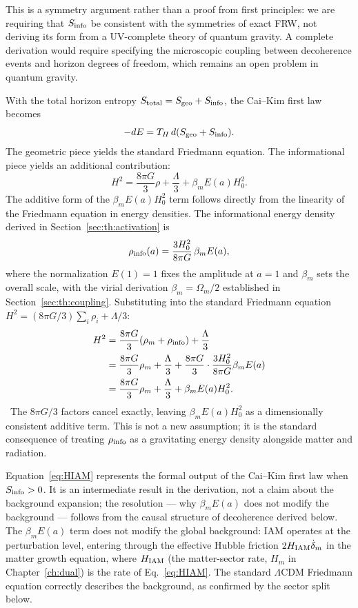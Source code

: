This is a symmetry argument rather than a proof from first principles: we are requiring that $S_{\rm info}$ be consistent with the symmetries of exact
FRW, not deriving its form from a UV-complete theory of quantum gravity. A complete derivation would require specifying the microscopic coupling between
decoherence events and horizon degrees of freedom, which remains an open problem in quantum gravity. \openprob

With the total horizon entropy $S_{\rm total}=S_{\rm geo}+S_{\rm info}$, the Cai--Kim first law becomes
\begin{equation}-dE=T_H\,d(S_{\rm geo}+S_{\rm info}).\label{eq:th:firstlaw3}\end{equation}
The geometric piece yields the standard Friedmann equation. The informational piece yields an additional contribution:
\begin{equation}H^2=\frac{8\pi G}{3}\rho+\frac\Lambda3+\beta_mE(a)H_0^2 .\label{eq:HIAM}\end{equation}
The additive form of the $\beta_mE(a)H_0^2$ term follows directly from the linearity of the Friedmann equation in energy densities. The informational
energy density derived in Section~\ref{sec:th:activation} is
\begin{equation}\rho_{\rm info}(a)=\frac{3H_0^2}{8\pi G}\,\beta_mE(a),\label{eq:th:rhoinfo}\end{equation}
where the normalization $E(1)=1$ fixes the amplitude at $a=1$ and $\beta_m$ sets the overall scale, with the virial derivation $\beta_m=\Omega_m/2$
established in Section~\ref{sec:th:coupling}. Substituting into the standard Friedmann equation $H^2=(8\pi G/3)\sum_i\rho_i+\Lambda/3$:
\begin{equation}\begin{aligned}H^2&=\frac{8\pi G}{3}(\rho_m+\rho_{\rm info})+\frac\Lambda3\\&=\frac{8\pi G}{3}\rho_m+\frac\Lambda3+\frac{8\pi G}{3}\cdot\frac{3H_0^2}{8\pi G}\beta_mE(a)
\\&=\frac{8\pi G}{3}\rho_m+\frac\Lambda3+\beta_mE(a)H_0^2 .\end{aligned}\label{eq:th:cancel}\end{equation}
\derived\ The $8\pi G/3$ factors cancel exactly, leaving $\beta_mE(a)H_0^2$ as a dimensionally consistent additive term. This is not a new assumption;
it is the standard consequence of treating $\rho_{\rm info}$ as a gravitating energy density alongside matter and radiation.

Equation~\eqref{eq:HIAM} represents the formal output of the Cai--Kim first law when $S_{\rm info}>0$. It is an intermediate result in the derivation,
not a claim about the background expansion; the resolution --- why $\beta_mE(a)$ does not modify the background --- follows from the causal structure of
decoherence derived below. The $\beta_mE(a)$ term does not modify the global background: IAM operates at the perturbation level, entering through the
effective Hubble friction $2H_{\rm IAM}\dot\delta_m$ in the matter growth equation, where $H_{\rm IAM}$ (the matter-sector rate, $H_m$ in
Chapter~\ref{ch:dual}) is the rate of Eq.~\eqref{eq:HIAM}. The standard $\Lambda$CDM Friedmann equation correctly describes the background, as confirmed by the
sector split below.

